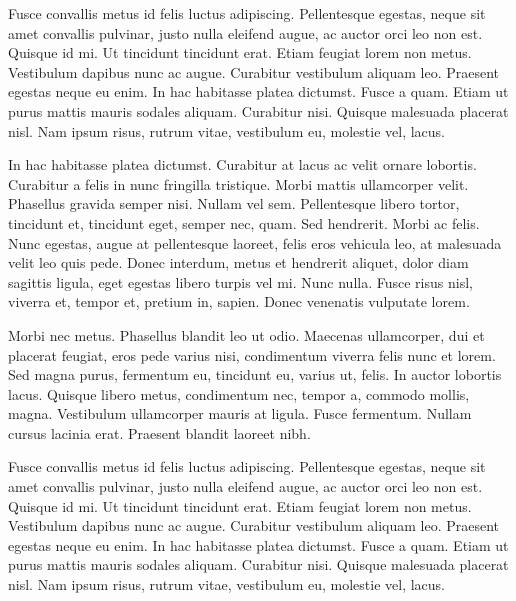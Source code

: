 \begin{multicols}{2}
Fusce convallis metus id felis luctus adipiscing. Pellentesque
egestas, neque sit amet convallis pulvinar, justo nulla eleifend
augue, ac auctor orci leo non est. Quisque id mi. Ut tincidunt
tincidunt erat. Etiam feugiat lorem non metus. Vestibulum dapibus nunc
ac augue. Curabitur vestibulum aliquam leo. Praesent egestas neque eu
enim. In hac habitasse platea dictumst. Fusce a quam. Etiam ut purus
mattis mauris sodales aliquam. Curabitur nisi. Quisque malesuada
placerat nisl. Nam ipsum risus, rutrum vitae, vestibulum eu, molestie
vel, lacus.

In hac habitasse platea dictumst. Curabitur at lacus ac velit ornare
lobortis. Curabitur a felis in nunc fringilla tristique. Morbi mattis
ullamcorper velit. Phasellus gravida semper nisi. Nullam vel sem.
Pellentesque libero tortor, tincidunt et, tincidunt eget, semper nec,
quam. Sed hendrerit. Morbi ac felis. Nunc egestas, augue at
pellentesque laoreet, felis eros vehicula leo, at malesuada velit leo
quis pede. Donec interdum, metus et hendrerit aliquet, dolor diam
sagittis ligula, eget egestas libero turpis vel mi. Nunc nulla. Fusce
risus nisl, viverra et, tempor et, pretium in, sapien. Donec venenatis
vulputate lorem.

Morbi nec metus. Phasellus blandit leo ut odio. Maecenas ullamcorper,
dui et placerat feugiat, eros pede varius nisi, condimentum viverra
felis nunc et lorem. Sed magna purus, fermentum eu, tincidunt eu,
varius ut, felis. In auctor lobortis lacus. Quisque libero metus,
condimentum nec, tempor a, commodo mollis, magna. Vestibulum
ullamcorper mauris at ligula. Fusce fermentum. Nullam cursus lacinia
erat. Praesent blandit laoreet nibh.

Fusce convallis metus id felis luctus adipiscing. Pellentesque
egestas, neque sit amet convallis pulvinar, justo nulla eleifend
augue, ac auctor orci leo non est. Quisque id mi. Ut tincidunt
tincidunt erat. Etiam feugiat lorem non metus. Vestibulum dapibus nunc
ac augue. Curabitur vestibulum aliquam leo. Praesent egestas neque eu
enim. In hac habitasse platea dictumst. Fusce a quam. Etiam ut purus
mattis mauris sodales aliquam. Curabitur nisi. Quisque malesuada
placerat nisl. Nam ipsum risus, rutrum vitae, vestibulum eu, molestie
vel, lacus.


\end{multicols}
